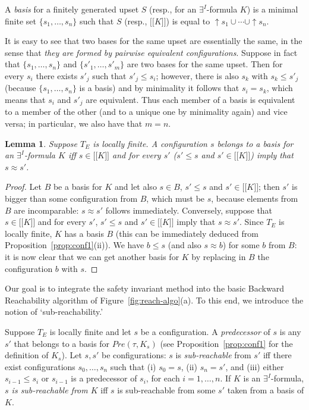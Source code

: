 \documentclass{LMCS}
\newcommand{\mywidehat}[1]{\ensuremath{\lbrack\!\lbrack #1 \rbrack\!\rbrack}}
\theoremstyle{plain}\newtheorem{assumption}[thm]{Assumption}
\theoremstyle{plain}\newtheorem{proposition}[thm]{Proposition}
\theoremstyle{plain}\newtheorem{property}[thm]{Property}
\theoremstyle{plain}\newtheorem{example}[thm]{Example}
\theoremstyle{plain}\newtheorem{claim}[thm]{Claim}
\theoremstyle{plain}\newtheorem{lemma}[thm]{Lemma}
\begin{document}
\begin{defi}
  A \emph{basis} for a finitely generated upset $S$ (resp., for an
  $\exists^I$-formula $K$) is a minimal finite  set $\{s_1, \dots, s_n\}$
  such that $S$ (resp., $\mywidehat{K}$) is equal to $\uparrow\!
  s_1\cup \cdots\cup \uparrow\! s_n$.
\end{defi}
It is easy to see that two bases for the same upset are essentially
the same, in the sense that \emph{they are formed by pairwise
  equivalent configurations}. Suppose in fact that $\{s_1, \dots,
s_n\}$ and $\{s'_1, \dots, s'_m\}$ are two bases for the same
upset. Then for every $s_i$ there exists $s'_j$ such that $s'_j\leq
s_i$; however, there is also $s_k$ with $s_k\leq s'_j$ (because
$\{s_1, \dots, s_n\}$ is a basis) and by minimality it follows that
$s_i=s_k$, which means that $s_i$ and $s'_j$ are equivalent. Thus each
member of a basis is equivalent to a member of the other (and to a
unique one by minimality again) and vice versa; in particular, we also
have that $m=n$.
\begin{lemma}\label{lem:basis}
Suppose $T_E$ is locally finite.
  A configuration $s$ belongs to a basis for an $\exists^I$-formula
  $K$ iff $s\in \mywidehat{K}$ and for every $s'$ ($s'\leq s$ and
  $s'\in \mywidehat{K}$) imply that $s\approx s'$.
\end{lemma}
\begin{proof}
  Let $B$ be a basis for $K$ and let also $s\in B$, $s'\leq s$ and
  $s'\in \mywidehat{K}$; then $s'$ is bigger than some configuration
  from $B$, which must be $s$, because elements from $B$ are
  incomparable: $s\approx s'$ follows immediately. Conversely, suppose
  that $s\in \mywidehat{K}$ and for every $s'$, $s'\leq s$ and $s'\in
  \mywidehat{K}$ imply that $s\approx s'$.  Since $T_E$ is locally
  finite, $K$ has a basis $B$ (this can be immediately deduced from
  Proposition~\ref{prop:conf1}(ii)). We have $b\leq s$ (and also
  $s\approx b$) for some $b$ from $B$: it is now clear that we can get
  another basis for $K$ by replacing in $B$ the configuration $b$ with
  $s$.
\end{proof}
Our goal is to integrate the safety invariant method into the basic
Backward Reachability algorithm of Figure~\ref{fig:reach-algo}(a).  To
this end, we introduce the
notion of `sub-reachability.'
\begin{defi}
  \label{def:subreach-configs}
  Suppose $T_E$ is locally finite and let $s$ be a configuration.  A
  \emph{predecessor} of $s$ is any $s'$ that belongs to a basis for
  ${Pre(\tau, K_s)}$ (see Proposition~\ref{prop:conf1} for the
  definition of $K_s$).  Let $s, s'$ be configurations: $s$ is
  \emph{sub-reachable} from $s'$ iff there exist configurations $s_0,
  \dots, s_n$ such that (i) $s_0=s$, (ii) $s_n=s'$, and (iii) either
  $s_{i-1}\leq s_i$ or $s_{i-1}$ is a predecessor of $s_i$, for each
  $i=1, \dots, n$.  If $K$ is an $\exists^I$-formula, \emph{$s$ is
    sub-reachable from $K$} iff $s$ is sub-reachable from some $s'$
  taken from a basis of ${K}$.
\end{defi}
\end{document}
